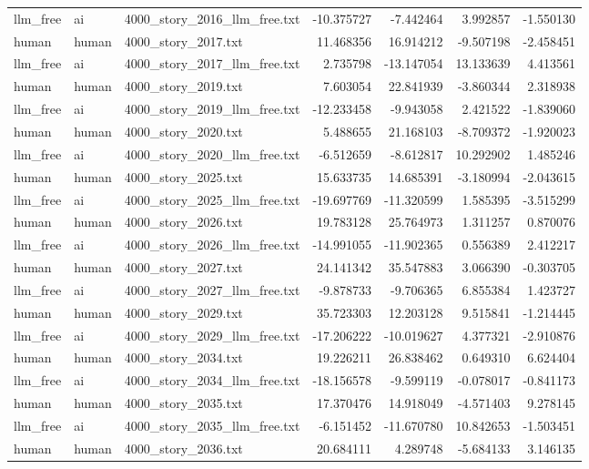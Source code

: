 \begin{longtable}{lllrrrr}
llm\_free & ai & 4000\_story\_2016\_llm\_free.txt & -10.375727 & -7.442464 & 3.992857 & -1.550130 \\
human & human & 4000\_story\_2017.txt & 11.468356 & 16.914212 & -9.507198 & -2.458451 \\
llm\_free & ai & 4000\_story\_2017\_llm\_free.txt & 2.735798 & -13.147054 & 13.133639 & 4.413561 \\
human & human & 4000\_story\_2019.txt & 7.603054 & 22.841939 & -3.860344 & 2.318938 \\
llm\_free & ai & 4000\_story\_2019\_llm\_free.txt & -12.233458 & -9.943058 & 2.421522 & -1.839060 \\
human & human & 4000\_story\_2020.txt & 5.488655 & 21.168103 & -8.709372 & -1.920023 \\
llm\_free & ai & 4000\_story\_2020\_llm\_free.txt & -6.512659 & -8.612817 & 10.292902 & 1.485246 \\
human & human & 4000\_story\_2025.txt & 15.633735 & 14.685391 & -3.180994 & -2.043615 \\
llm\_free & ai & 4000\_story\_2025\_llm\_free.txt & -19.697769 & -11.320599 & 1.585395 & -3.515299 \\
human & human & 4000\_story\_2026.txt & 19.783128 & 25.764973 & 1.311257 & 0.870076 \\
llm\_free & ai & 4000\_story\_2026\_llm\_free.txt & -14.991055 & -11.902365 & 0.556389 & 2.412217 \\
human & human & 4000\_story\_2027.txt & 24.141342 & 35.547883 & 3.066390 & -0.303705 \\
llm\_free & ai & 4000\_story\_2027\_llm\_free.txt & -9.878733 & -9.706365 & 6.855384 & 1.423727 \\
human & human & 4000\_story\_2029.txt & 35.723303 & 12.203128 & 9.515841 & -1.214445 \\
llm\_free & ai & 4000\_story\_2029\_llm\_free.txt & -17.206222 & -10.019627 & 4.377321 & -2.910876 \\
human & human & 4000\_story\_2034.txt & 19.226211 & 26.838462 & 0.649310 & 6.624404 \\
llm\_free & ai & 4000\_story\_2034\_llm\_free.txt & -18.156578 & -9.599119 & -0.078017 & -0.841173 \\
human & human & 4000\_story\_2035.txt & 17.370476 & 14.918049 & -4.571403 & 9.278145 \\
llm\_free & ai & 4000\_story\_2035\_llm\_free.txt & -6.151452 & -11.670780 & 10.842653 & -1.503451 \\
human & human & 4000\_story\_2036.txt & 20.684111 & 4.289748 & -5.684133 & 3.146135 \\

\end{longtable}
